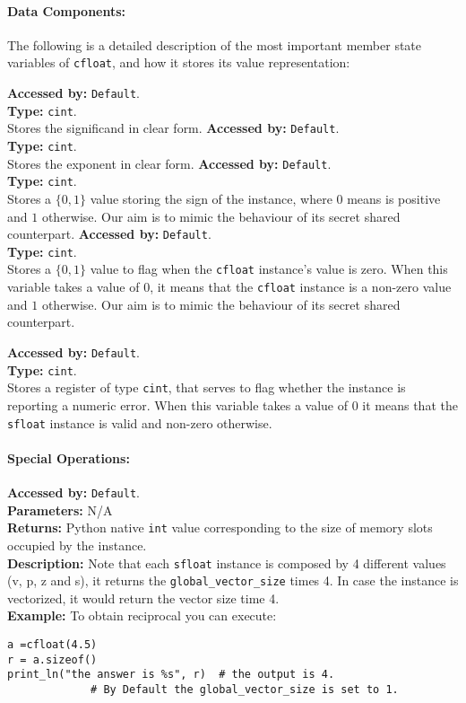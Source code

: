\paragraph{Data Components:}
The following is a detailed description of the most important member state variables of \verb|cfloat|, and how it stores its value representation:

\textbf{Accessed by:} \verb|Default|.\\
\textbf{Type:} \verb|cint|.\\
Stores the significand in clear form.
\textbf{Accessed by:} \verb|Default|.\\
\textbf{Type:} \verb|cint|.\\
Stores the  exponent in clear form.
\textbf{Accessed by:} \verb|Default|.\\
\textbf{Type:} \verb|cint|.\\
Stores a $\{0,1\}$ value storing the sign of the instance,
where $0$ means is positive and $1$ otherwise.
Our aim is to mimic the behaviour of its secret shared counterpart.
\textbf{Accessed by:} \verb|Default|.\\
\textbf{Type:} \verb|cint|.\\
Stores a $\{0,1\}$ value to flag when the \verb|cfloat|
instance's value is zero.
When this variable takes a value of $0$, it means that the \verb|cfloat|
instance is a non-zero value and $1$ otherwise.
Our aim is to mimic the behaviour of its secret shared counterpart.

\textbf{Accessed by:} \verb|Default|.\\
\textbf{Type:} \verb|cint|.\\
Stores a register of type \verb|cint|,
that serves to flag whether the instance is reporting a numeric error.
When this variable takes a value of $0$
it means that the \verb|sfloat| instance is valid and non-zero otherwise.


\paragraph{Special Operations:}
\textbf{Accessed by:} \verb|Default|. \\
\textbf{Parameters:} N/A \\
\textbf{Returns:}
Python native \verb|int| value corresponding to the size of memory slots occupied by the instance. \\
\textbf{Description:}
Note that each \verb|sfloat| instance is composed by 4
different values (v, p, z and s),
it returns the \verb|global_vector_size| times 4.
In case the instance is vectorized,
it would return the vector size time 4.\\
\textbf{Example:}
To obtain reciprocal you can execute:
\begin{lstlisting}
a =cfloat(4.5)
r = a.sizeof()
print_ln("the answer is %s", r)  # the output is 4.
			 # By Default the global_vector_size is set to 1.
\end{lstlisting}

